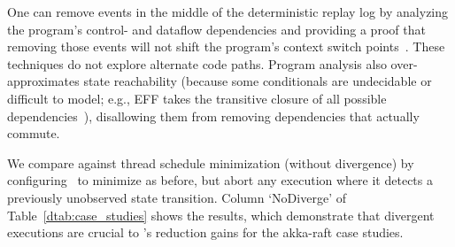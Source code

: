 %
%
%
 One can remove events in the middle of the deterministic
replay log by analyzing the program's control- and
dataflow dependencies and providing a proof that removing those events will not shift the
program's context switch points~\cite{Lee:2011:TGR:1993498.1993528,tallam2007enabling,huang2012lean,cai2013lock,elyasov2013guided,wang2015fast}.
These techniques do not explore alternate code paths. Program analysis also over-approximates
state reachability (because some conditionals are undecidable or difficult to
model; e.g., EFF takes the transitive closure of all possible
dependencies~\cite{Lee:2011:TGR:1993498.1993528}), disallowing them from removing dependencies that actually commute.

We compare against thread schedule minimization (without divergence) by configuring \sys~to minimize as before, but abort any execution
where it detects a previously unobserved state transition. Column `NoDiverge'
of Table~\ref{dtab:case_studies} shows the results, which demonstrate that
divergent executions are crucial to \sys's reduction gains for the akka-raft case studies.

